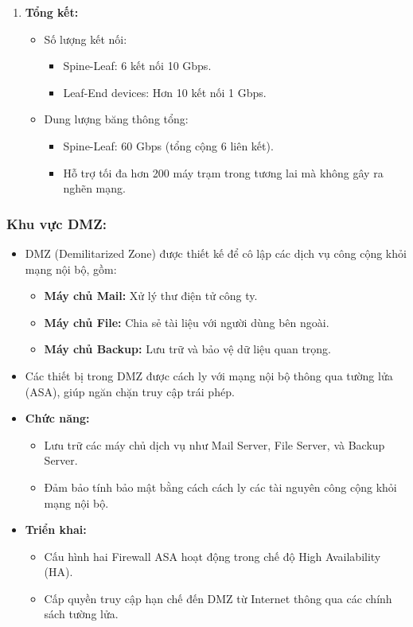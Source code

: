 \documentclass[13pt]{article}
\begin{document}
\begin{enumerate}
    \item \textbf{Tổng kết:}
    \begin{itemize}
        \item Số lượng kết nối:
        \begin{itemize}
            \item Spine-Leaf: 6 kết nối 10 Gbps.
            \item Leaf-End devices: Hơn 10 kết nối 1 Gbps.
        \end{itemize}
        \item Dung lượng băng thông tổng:
        \begin{itemize}
            \item Spine-Leaf: 60 Gbps (tổng cộng 6 liên kết).
            \item Hỗ trợ tối đa hơn 200 máy trạm trong tương lai mà không gây ra nghẽn mạng.
        \end{itemize}
    \end{itemize}
\end{enumerate}

\subsubsection{Khu vực DMZ:}
\begin{itemize}
    \item DMZ (Demilitarized Zone) được thiết kế để cô lập các dịch vụ công cộng khỏi mạng nội bộ, gồm:
        \begin{itemize}
        \item \textbf{Máy chủ Mail: }Xử lý thư điện tử công ty.
        \item \textbf{Máy chủ File: }Chia sẻ tài liệu với người dùng bên ngoài.
        \item \textbf{Máy chủ Backup: }Lưu trữ và bảo vệ dữ liệu quan trọng.
        \end{itemize}
    \item Các thiết bị trong DMZ được cách ly với mạng nội bộ thông qua tường lửa (ASA), giúp ngăn chặn truy cập trái phép.
\end{itemize}

\begin{itemize}
    \item \textbf{Chức năng:}
    \begin{itemize}
        \item Lưu trữ các máy chủ dịch vụ như Mail Server, File Server, và Backup Server.
        \item Đảm bảo tính bảo mật bằng cách cách ly các tài nguyên công cộng khỏi mạng nội bộ.
    \end{itemize}
    
    \item \textbf{Triển khai:}
    \begin{itemize}
        \item Cấu hình hai Firewall ASA hoạt động trong chế độ High Availability (HA).
        \item Cấp quyền truy cập hạn chế đến DMZ từ Internet thông qua các chính sách tường lửa.
    \end{itemize}
\end{itemize}
\end{document}
